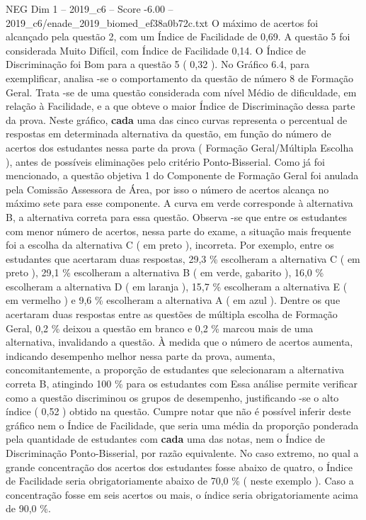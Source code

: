 \begin{textsample}{NEG Dim 1 – 2019\_c6 – Score -6.00 – 2019\_c6/enade\_2019\_biomed\_ef38a0b72c.txt}
O máximo de acertos foi alcançado pela questão 2, com um Índice de Facilidade de 0,69.
A questão 5 foi considerada Muito Difícil, com Índice de Facilidade 0,14.
O Índice de Discriminação foi Bom para a questão 5 ( 0,32 ).
No Gráfico 6.4, para exemplificar, analisa -se o comportamento da questão de número 8 de Formação Geral.
Trata -se de uma questão considerada com nível Médio de dificuldade, em relação à Facilidade, e a que obteve o maior Índice de Discriminação dessa parte da prova.
Neste gráfico, \textbf{cada} uma das cinco curvas representa o percentual de respostas em determinada alternativa da questão, em função do número de acertos dos estudantes nessa parte da prova ( Formação Geral/Múltipla Escolha ), antes de possíveis eliminações pelo critério Ponto-Bisserial.
Como já foi mencionado, a questão objetiva 1 do Componente de Formação Geral foi anulada pela Comissão Assessora de Área, por isso o número de acertos alcança no máximo sete para esse componente.
A curva em verde corresponde à alternativa B, a alternativa correta para essa questão.
Observa -se que entre os estudantes com menor número de acertos, nessa parte do exame, a situação mais frequente foi a escolha da alternativa C ( em preto ), incorreta.
Por exemplo, entre os estudantes que acertaram duas respostas, 29,3 \% escolheram a alternativa C ( em preto ), 29,1 \% escolheram a alternativa B ( em verde, gabarito ), 16,0 \% escolheram a alternativa D ( em laranja ), 15,7 \% escolheram a alternativa E ( em vermelho ) e 9,6 \% escolheram a alternativa A ( em azul ).
Dentre os que acertaram duas respostas entre as questões de múltipla escolha de Formação Geral, 0,2 \% deixou a questão em branco e 0,2 \% marcou mais de uma alternativa, invalidando a questão.
À medida que o número de acertos aumenta, indicando desempenho melhor nessa parte da prova, aumenta, concomitantemente, a proporção de estudantes que selecionaram a alternativa correta B, atingindo 100 \% para os estudantes com Essa análise permite verificar como a questão discriminou os grupos de desempenho, justificando -se o alto índice ( 0,52 ) obtido na questão.
Cumpre notar que não é possível inferir deste gráfico nem o Índice de Facilidade, que seria uma média da proporção ponderada pela quantidade de estudantes com \textbf{cada} uma das notas, nem o Índice de Discriminação Ponto-Bisserial, por razão equivalente.
No caso extremo, no qual a grande concentração dos acertos dos estudantes fosse abaixo de quatro, o Índice de Facilidade seria obrigatoriamente abaixo de 70,0 \% ( neste exemplo ).
Caso a concentração fosse em seis acertos ou mais, o índice seria obrigatoriamente acima de 90,0 \%.

\end{textsample}
